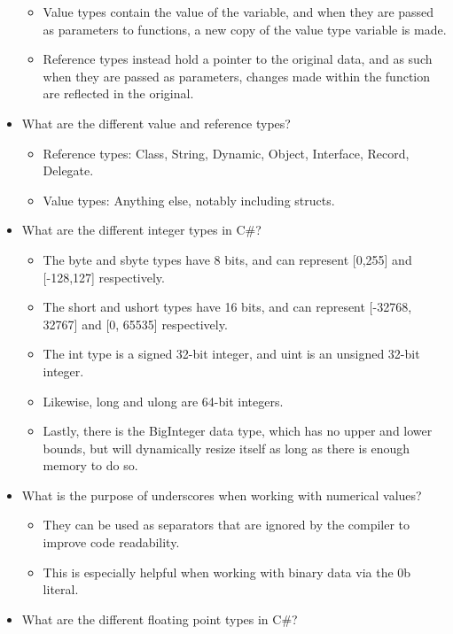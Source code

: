 \documentclass{article}
\begin{document}
\begin{itemize}
    \begin{itemize}
        \item Value types contain the value of the variable, and when they are passed as parameters to functions, a new copy of the value type variable is made.
        \item Reference types instead hold a pointer to the original data, and as such when they are passed as parameters, changes made within the function are reflected in the original.
    \end{itemize}
    \item What are the different value and reference types?
    \begin{itemize}
        \item Reference types: Class, String, Dynamic, Object, Interface, Record, Delegate.
        \item Value types: Anything else, notably including structs.
    \end{itemize}
    \item What are the different integer types in C\#?
    \begin{itemize}
        \item The byte and sbyte types have 8 bits, and can represent [0,255] and [-128,127] respectively.
        \item The short and ushort types have 16 bits, and can represent [-32768, 32767] and [0, 65535] respectively.
        \item The int type is a signed 32-bit integer, and uint is an unsigned 32-bit integer.
        \item Likewise, long and ulong are 64-bit integers.
        \item Lastly, there is the BigInteger data type, which has no upper and lower bounds, but will dynamically resize itself as long as there is enough memory to do so.
    \end{itemize}
    \item What is the purpose of underscores when working with numerical values?
    \begin{itemize}
        \item They can be used as separators that are ignored by the compiler to improve code readability.
        \item This is especially helpful when working with binary data via the 0b literal.
    \end{itemize}
    \item What are the different floating point types in C\#?
    \begin{itemize}

\end{itemize}
\end{itemize}
\end{document}
